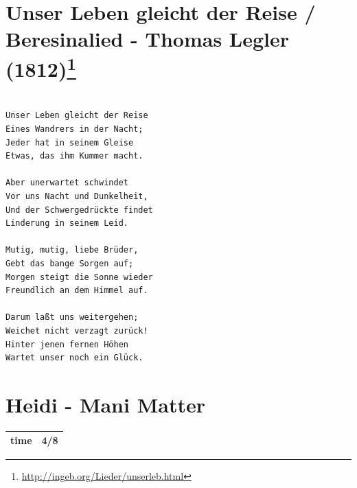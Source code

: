 \documentclass[
]{book}
\let\stdsection\section
\renewcommand\section{\clearpage\stdsection}
\begin{document}
\hypertarget{mundart-und-deutsch-beresinalied}{%
\section[Unser Leben gleicht der Reise / Beresinalied - Thomas Legler (1812)]{\texorpdfstring{Unser Leben gleicht der Reise / Beresinalied - Thomas Legler (1812)\footnote{\url{http://ingeb.org/Lieder/unserleb.html}}}{Unser Leben gleicht der Reise / Beresinalied - Thomas Legler (1812)}}\label{mundart-und-deutsch-beresinalied}}

\begin{verbatim}

Unser Leben gleicht der Reise
Eines Wandrers in der Nacht;
Jeder hat in seinem Gleise
Etwas, das ihm Kummer macht.

Aber unerwartet schwindet
Vor uns Nacht und Dunkelheit,
Und der Schwergedrückte findet
Linderung in seinem Leid. 

Mutig, mutig, liebe Brüder,
Gebt das bange Sorgen auf;
Morgen steigt die Sonne wieder
Freundlich an dem Himmel auf.

Darum laßt uns weitergehen;
Weichet nicht verzagt zurück!
Hinter jenen fernen Höhen
Wartet unser noch ein Glück. 
\end{verbatim}

\hypertarget{mundart-und-deutsch-heidi}{%
\section{Heidi - Mani Matter}\label{mundart-und-deutsch-heidi}}

\begin{longtable}[]{@{}ll@{}}
\toprule
\endhead
time & 4/8\tabularnewline
\bottomrule
\end{longtable}
\end{document}
